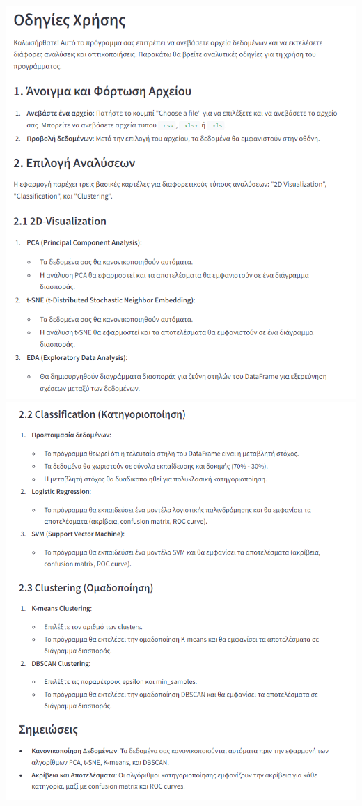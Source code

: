 \documentclass{article}
\begin{document}
\includegraphics[width=1.0\linewidth]{tab3_info1.png}
\newpage
\includegraphics[width=1.0\linewidth]{tab3_info2.png}
\end{document}
